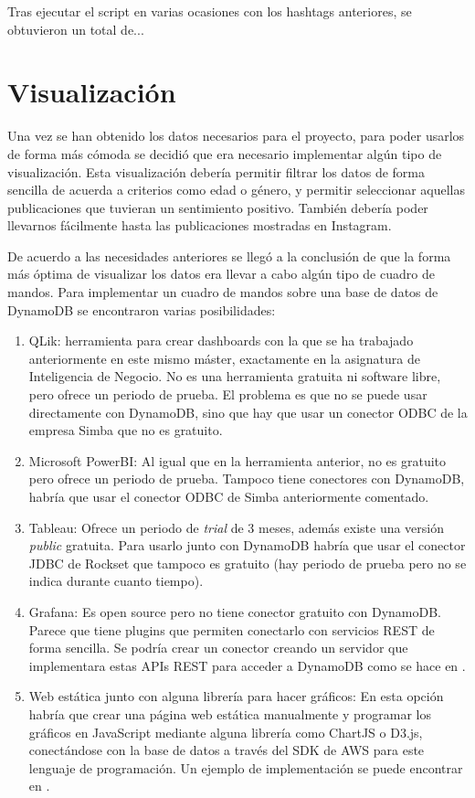 Tras ejecutar el script en varias ocasiones con los hashtags anteriores, se obtuvieron un total de...

\section{Visualización}

Una vez se han obtenido los datos necesarios para el proyecto, para poder usarlos de forma más cómoda se decidió que era necesario implementar algún tipo de visualización. Esta visualización debería permitir filtrar los datos de forma sencilla de acuerda a criterios como edad o género, y permitir seleccionar aquellas publicaciones que tuvieran un sentimiento positivo. También debería poder llevarnos fácilmente hasta las publicaciones mostradas en Instagram.

De acuerdo a las necesidades anteriores se llegó a la conclusión de que la forma más óptima de visualizar los datos era llevar a cabo algún tipo de cuadro de mandos. Para implementar un cuadro de mandos sobre una base de datos de DynamoDB se encontraron varias posibilidades:

\begin{enumerate}
    \item QLik: herramienta para crear dashboards con la que se ha trabajado anteriormente en este mismo máster, exactamente en la asignatura de Inteligencia de Negocio. No es una herramienta gratuita ni software libre, pero ofrece un periodo de prueba. El problema es que no se puede usar directamente con DynamoDB, sino que hay que usar un conector ODBC de la empresa Simba que no es gratuito.
    \item Microsoft PowerBI: Al igual que en la herramienta anterior, no es gratuito pero ofrece un periodo de prueba. Tampoco tiene conectores con DynamoDB, habría que usar el conector ODBC de Simba anteriormente comentado.
    \item Tableau: Ofrece un periodo de \textit{trial} de 3 meses, además existe una versión \textit{public} gratuita. Para usarlo junto con DynamoDB habría que usar el conector JDBC de Rockset que tampoco es gratuito (hay periodo de prueba pero no se indica durante cuanto tiempo).
    \item Grafana: Es open source pero no tiene conector gratuito con DynamoDB. Parece que tiene plugins que permiten conectarlo con servicios REST de forma sencilla. Se podría crear un conector creando un servidor que implementara estas APIs REST para acceder a DynamoDB como se hace en \cite{grafana_lambda_api}.
    \item Web estática junto con alguna librería para hacer gráficos: En esta opción habría que crear una página web estática manualmente y programar los gráficos en JavaScript mediante alguna librería como ChartJS o D3.js, conectándose con la base de datos a través del SDK de AWS para este lenguaje de programación. Un ejemplo de implementación se puede encontrar en \cite{web_chartjs}.
\end{enumerate}

